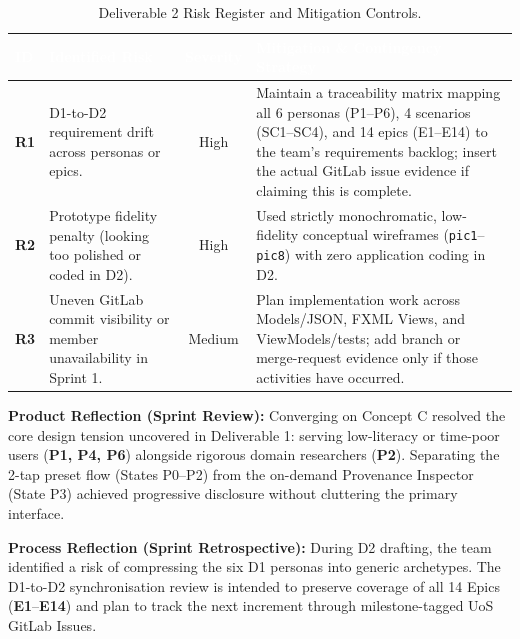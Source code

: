\documentclass[12pt, a4paper]{article}
\begin{document}
\begin{table}[H]
\centering
\small
\renewcommand{\arraystretch}{1.35}
\begin{tabularx}{\textwidth}{@{} p{1.2cm} p{3.4cm} c X @{}}
\toprule
\rowcolor{AcademicNavy}
\textcolor{white}{\textbf{ID}} & \textcolor{white}{\textbf{Identified Risk}} & \textcolor{white}{\textbf{Severity}} & \textcolor{white}{\textbf{Mitigation \& Contingency Strategy}} \\
\midrule
\textbf{R1} & D1-to-D2 requirement drift across personas or epics. & High & Maintain a traceability matrix mapping all 6 personas (P1--P6), 4 scenarios (SC1--SC4), and 14 epics (E1--E14) to the team's requirements backlog; insert the actual GitLab issue evidence if claiming this is complete. \\
\rowcolor{RowAlt}
\textbf{R2} & Prototype fidelity penalty (looking too polished or coded in D2). & High & Used strictly monochromatic, low-fidelity conceptual wireframes (\texttt{pic1}--\texttt{pic8}) with zero application coding in D2. \\
\textbf{R3} & Uneven GitLab commit visibility or member unavailability in Sprint 1. & Medium & Plan implementation work across Models/JSON, FXML Views, and ViewModels/tests; add branch or merge-request evidence only if those activities have occurred. \\
\bottomrule
\end{tabularx}
\caption{Deliverable 2 Risk Register and Mitigation Controls.}
\label{tab:risk-log}
\end{table}

\textbf{Product Reflection (Sprint Review):} Converging on Concept C resolved the core design tension uncovered in Deliverable 1: serving low-literacy or time-poor users (\textbf{P1, P4, P6}) alongside rigorous domain researchers (\textbf{P2}). Separating the 2-tap preset flow (States P0--P2) from the on-demand Provenance Inspector (State P3) achieved progressive disclosure without cluttering the primary interface.

\textbf{Process Reflection (Sprint Retrospective):} During D2 drafting, the team identified a risk of compressing the six D1 personas into generic archetypes. The D1-to-D2 synchronisation review is intended to preserve coverage of all 14 Epics (\textbf{E1}--\textbf{E14}) and plan to track the next increment through milestone-tagged UoS GitLab Issues.

\end{document}
